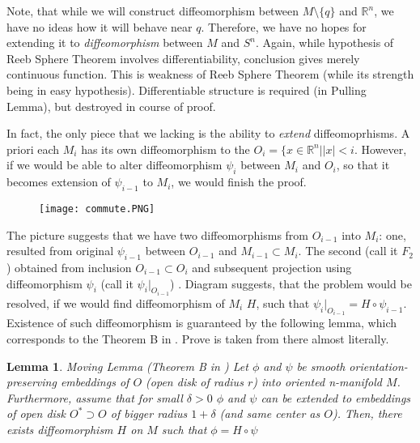 \documentclass[8pt]{article} %
\newtheorem{lemma}[theorem]{Lemma}
\newenvironment{remark}[1][Remark]{\begin{trivlist}
\item[\hskip \labelsep {\bfseries #1}]}{\end{trivlist}}
\begin{document}
\begin{remark}
Note, that while we will construct diffeomorphism between $M\setminus\{q\}$ and $\mathbb{R}^n$, we have no ideas
how it will behave near $q$. Therefore, we have no hopes for extending it to \textit{diffeomorphism} between $M$ and $S^n$. Again,
while hypothesis of Reeb Sphere Theorem involves differentiability, conclusion gives merely continuous function. This is weakness of Reeb Sphere
Theorem (while its strength being in easy hypothesis). Differentiable structure is required (in Pulling Lemma), but destroyed in course of proof.\\
\end{remark}
In fact, the only piece that we lacking is the ability to \textit{extend} diffeomoprhisms.
A priori each $M_i$ has its own diffeomorphism
to the $O_i=\{x\in\mathbb{R}^n||x|<i$. However, if we would be able to alter 
diffeomorphism $\psi_i$ between $M_i$ and $O_i$, so that it becomes extension of $\psi_{i-1}$ to $M_i$, we would finish the proof.\\
\begin{figure}[H]
\centering
\texttt{[image: commute.PNG]}
\caption{}
\end{figure}
The picture suggests that we have two diffeomorphisms from $O_{i-1}$ into $M_i$: one, resulted from original $\psi_{i-1}$
between $O_{i-1}$ and $M_{i-1}\subset M_i$. The second (call it $F_2$) obtained
from inclusion $O_{i-1}\subset O_i$ and subsequent projection using diffeomorphism $\psi_i$ (call it $\psi_i|_{O_{i-1}}$)
. Diagram suggests, that the problem would be resolved, if we would find diffeomorphism of $M_i$ $H$, such that $\psi_i|_{O_{i-1}}=H\circ 
\psi_{i-1}$.
Existence of such diffeomorphism is guaranteed by the following lemma, which corresponds to the Theorem B in \cite{palaisOuter}. Prove is taken
from there almost literally.
\begin{lemma}{Moving Lemma (Theorem B in \cite{palaisOuter})}
	\label{MovingLemma} Let $\phi$ and $\psi$ be smooth orientation-preserving embeddings of $O$ (open disk of radius $r$)
	into oriented n-manifold $M$. Furthermore, assume that for small $\delta>0$ $\phi$ and $\psi$ can be extended to embeddings
	of open disk $O^*\supset O$ of bigger radius $1+\delta$ (and same center as $O$).
	Then, there exists diffeomorphism $H$ on $M$ such that $\phi=H\circ\psi$
\end{lemma}
\end{document}
